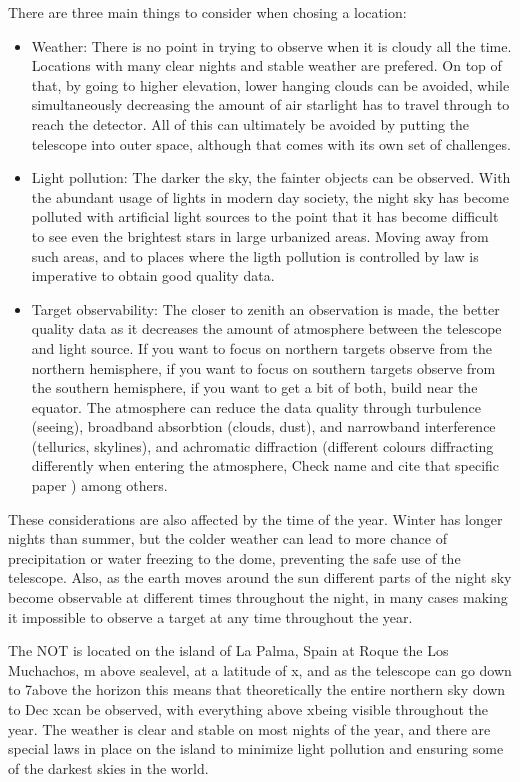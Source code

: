 \documentclass[a4paper,oneside,12pt, class=Latex/Classes/PhDthesisPSnPDF, crop=false]{standalone}
\begin{document}
There are three main things to consider when chosing a location:
\begin{itemize}
	\item {Weather: There is no point in trying to observe when it is cloudy all the time. Locations with many clear nights and stable weather are prefered. On top of that, by going to higher elevation, lower hanging clouds can be avoided, while simultaneously decreasing the amount of air starlight has to travel through to reach the detector. All of this can ultimately be avoided by putting the telescope into outer space, although that comes with its own set of challenges.}
	\item {Light pollution: The darker the sky, the fainter objects can be observed. With the abundant usage of lights in modern day society, the night sky has become polluted with artificial light sources to the point that it has become difficult to see even the brightest stars in large urbanized areas. Moving away from such areas, and to places where the ligth pollution is controlled by law is imperative to obtain good quality data.}
	\item {Target observability: The closer to zenith an observation is made, the better quality data as it decreases the amount of atmosphere between the telescope and light source. If you want to focus on northern targets observe from the northern hemisphere, if you want to focus on southern targets observe from the southern hemisphere, if you want to get a bit of both, build near the equator. The atmosphere can reduce the data quality through turbulence (seeing), broadband absorbtion (clouds, dust), and narrowband interference (tellurics, skylines), and achromatic diffraction (different colours diffracting differently when entering the atmosphere, \color{red} Check name and cite that specific paper \color{black}) among others.}
\end{itemize}

These considerations are also affected by the time of the year. Winter has longer nights than summer, but the colder weather can lead to more chance of precipitation or water freezing to the dome, preventing the safe use of the telescope. Also, as the earth moves around the sun different parts of the night sky become observable at different times throughout the night, in many cases making it impossible to observe a target at any time throughout the year.

The NOT is located on the island of La Palma, Spain at Roque the Los Muchachos, m above sealevel, at a latitude of \color{red}x\color{black}\degree, and as the telescope can go down to 7\degree above the horizon this means that theoretically the entire northern sky down to Dec \color{red}x\color{black}\degree can be observed, with everything above \color{red}x\color{black}\degree being visible throughout the year. The weather is clear and stable on most nights of the year, and there are special laws in place on the island to minimize light pollution and ensuring some of the darkest skies in the world.
\end{document}
